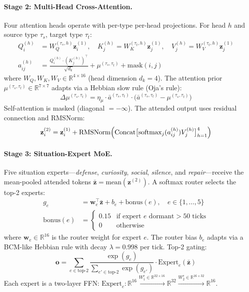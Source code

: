 \documentclass[11pt]{article}
\begin{document}
\paragraph{Stage 2: Multi-Head Cross-Attention.}
Four attention heads operate with per-type per-head projections. For head $h$ and source type $\tau_s$, target type $\tau_t$:
\begin{align}
Q_i^{(h)} &= W_Q^{(\tau_s, h)} \mathbf{z}_i^{(1)}, \quad K_j^{(h)} = W_K^{(\tau_t, h)} \mathbf{z}_j^{(1)}, \quad V_j^{(h)} = W_V^{(\tau_t, h)} \mathbf{z}_j^{(1)} \\
a_{ij}^{(h)} &= \frac{Q_i^{(h)} \cdot (K_j^{(h)})^\top}{\sqrt{d_k}} + \mu^{(\tau_s, \tau_t)} + \text{mask}(i,j)
\end{align}
where $W_Q, W_K, W_V \in \mathbb{R}^{4 \times 16}$ (head dimension $d_k = 4$). The attention prior $\mu^{(\tau_s, \tau_t)} \in \mathbb{R}^{7 \times 7}$ adapts via a Hebbian slow rule (Oja's rule):
\begin{equation}
\Delta\mu^{(\tau_s, \tau_t)} = \eta_\mu \cdot \bar{a}^{(\tau_s, \tau_t)} \cdot \bigl(\bar{a}^{(\tau_s, \tau_t)} - \mu^{(\tau_s, \tau_t)}\bigr)
\end{equation}
Self-attention is masked (diagonal $= -\infty$). The attended output uses residual connection and RMSNorm:
\begin{equation}
\mathbf{z}_i^{(2)} = \mathbf{z}_i^{(1)} + \text{RMSNorm}\Bigl(\text{Concat}\bigl[\text{softmax}_j(a_{ij}^{(h)}) V_j^{(h)}\bigr]_{h=1}^4\Bigr)
\end{equation}

\paragraph{Stage 3: Situation-Expert MoE.}
Five situation experts---\emph{defense}, \emph{curiosity}, \emph{social}, \emph{silence}, and \emph{repair}---receive the mean-pooled attended tokens $\bar{\mathbf{z}} = \text{mean}(\mathbf{z}^{(2)})$. A softmax router selects the top-2 experts:
\begin{align}
g_e &= \mathbf{w}_e^\top \bar{\mathbf{z}} + b_e + \text{bonus}(e), \quad e \in \{1,\ldots,5\} \\
\text{bonus}(e) &= \begin{cases} 0.15 & \text{if expert } e \text{ dormant} > 50 \text{ ticks} \\ 0 & \text{otherwise} \end{cases}
\end{align}
where $\mathbf{w}_e \in \mathbb{R}^{16}$ is the router weight for expert $e$. The router bias $b_e$ adapts via a BCM-like Hebbian rule with decay $\lambda = 0.998$ per tick. Top-2 gating:
\begin{equation}
\mathbf{o} = \sum_{e \in \text{top-2}} \frac{\exp(g_e)}{\sum_{e' \in \text{top-2}} \exp(g_{e'})} \cdot \text{Expert}_e(\bar{\mathbf{z}})
\end{equation}
Each expert is a two-layer FFN: $\text{Expert}_e: \mathbb{R}^{16} \xrightarrow{W_1^e \in \mathbb{R}^{32 \times 16}} \mathbb{R}^{32} \xrightarrow{W_2^e \in \mathbb{R}^{16 \times 32}} \mathbb{R}^{16}$.
\end{document}
